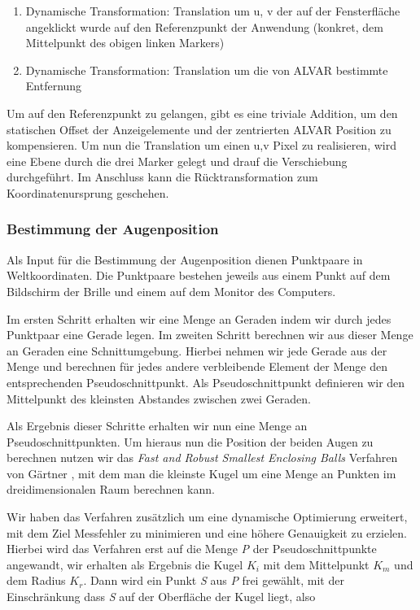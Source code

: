    \begin{enumerate}
      \item Dynamische Transformation:  Translation  um u, v der auf der Fensterfläche angeklickt wurde auf den Referenzpunkt der Anwendung (konkret, dem Mittelpunkt des obigen linken Markers) 
      \item Dynamische Transformation: Translation um die von ALVAR bestimmte Entfernung
   \end{enumerate}

Um auf den Referenzpunkt zu gelangen, gibt es eine triviale Addition, um den statischen Offset der Anzeigelemente und der zentrierten ALVAR Position zu kompensieren. 
Um nun die Translation um einen u,v Pixel zu realisieren, wird eine Ebene durch die drei Marker gelegt und drauf die Verschiebung durchgeführt. 
Im Anschluss kann die Rücktransformation zum Koordinatenursprung geschehen.


\subsubsection{Bestimmung der Augenposition}
\label{sec:Augenposition}
Als Input für die Bestimmung der Augenposition dienen Punktpaare in Weltkoordinaten. Die Punktpaare bestehen jeweils aus einem Punkt auf dem Bildschirm der Brille und einem auf dem Monitor des Computers.

Im ersten Schritt erhalten wir eine Menge an Geraden indem wir durch jedes Punktpaar eine Gerade legen. Im zweiten Schritt berechnen wir aus dieser Menge an Geraden eine Schnittumgebung. Hierbei nehmen wir jede Gerade aus der Menge und berechnen für jedes andere verbleibende Element der Menge den entsprechenden Pseudoschnittpunkt. Als Pseudoschnittpunkt definieren wir den      Mittelpunkt des kleinsten Abstandes zwischen zwei Geraden.

Als Ergebnis dieser Schritte erhalten wir nun eine Menge an Pseudoschnittpunkten. Um hieraus nun die Position der beiden Augen zu berechnen nutzen wir das \emph{Fast and Robust Smallest Enclosing Balls} Verfahren von Gärtner \cite{gaertner}, mit dem man die kleinste Kugel um eine Menge an Punkten im dreidimensionalen Raum berechnen kann.

Wir haben das Verfahren zusätzlich um eine dynamische Optimierung erweitert, mit dem Ziel
Messfehler zu minimieren und eine höhere Genauigkeit zu erzielen.\\ 

Hierbei wird das Verfahren erst auf die Menge \emph{P} der Pseudoschnittpunkte angewandt, wir erhalten als Ergebnis die Kugel $K_i$ mit  dem Mittelpunkt $K_m$ und dem Radius $K_r$. Dann wird ein Punkt \emph{S} aus \emph{P} frei gewählt, mit der Einschränkung dass \emph{S} auf der Oberfläche der Kugel liegt, also

